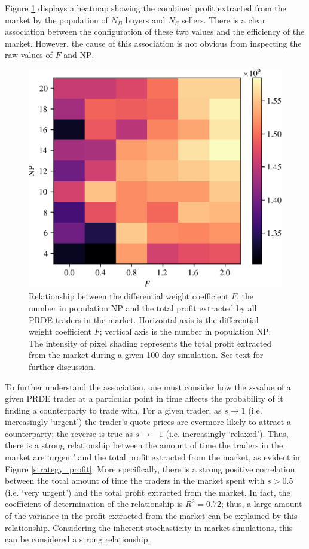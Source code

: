 \documentclass[conference]{IEEEtran}
\begin{document}
Figure \ref{profit_grid} displays a heatmap showing the combined profit extracted from the market by the population of $N_B$ buyers and $N_S$ sellers.
There is a clear association between the configuration of these two values and the efficiency of the market.
However, the cause of this association is not obvious from inspecting the raw values of $F$ and $\mathrm{NP}$.

\begin{figure}[htbp]
    \centerline{\includegraphics[width=\columnwidth]{profit_grid.png}}
    \caption{
        Relationship between the differential weight coefficient $F$, the number in population $\mathrm{NP}$ and the total profit extracted by all PRDE traders in the market.
        Horizontal axis is the differential weight coefficient $F$; vertical axis is the number in population $\mathrm{NP}$.
        The intensity of pixel shading represents the total profit extracted from the market during a given 100-day simulation.
        See text for further discussion.
    }
    \label{profit_grid}
\end{figure}

To further understand the association, one must consider how the $s$-value of a given PRDE trader at a particular point in time affects the probability of it finding a counterparty to trade with.
For a given trader, as $s\to1$ (i.e. increasingly `urgent') the trader's quote prices are evermore likely to attract a counterparty; the reverse is true as $s\to-1$ (i.e. increasingly `relaxed').
Thus, there is a strong relationship between the amount of time the traders in the market are `urgent' and the total profit extracted from the market, as evident in Figure \ref{strategy_profit}.
More specifically, there is a strong positive correlation between the total amount of time the traders in the market spent with $s>0.5$ (i.e. `very urgent') and the total profit extracted from the market.
In fact, the coefficient of determination of the relationship is $R^2=0.72$; thus, a large amount of the variance in the profit extracted from the market can be explained by this relationship.
Considering the inherent stochasticity in market simulations, this can be considered a strong relationship.
\end{document}
